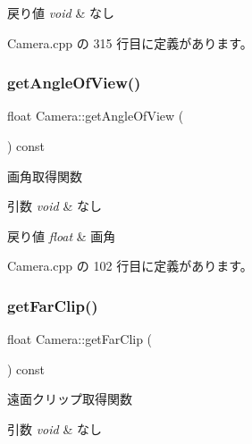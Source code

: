 \begin{DoxyRetVals}{戻り値}
{\em void} & なし \\
\hline
\end{DoxyRetVals}


 Camera.\+cpp の 315 行目に定義があります。

\mbox{\label{class_camera_a19d2d19ddd9307c66075c83e515bda57}} 
\subsubsection{\texorpdfstring{get\+Angle\+Of\+View()}{getAngleOfView()}}
{\footnotesize\ttfamily float Camera\+::get\+Angle\+Of\+View (\begin{DoxyParamCaption}{ }\end{DoxyParamCaption}) const}



画角取得関数 


\begin{DoxyParams}{引数}
{\em void} & なし \\
\hline
\end{DoxyParams}

\begin{DoxyRetVals}{戻り値}
{\em float} & 画角 \\
\hline
\end{DoxyRetVals}


 Camera.\+cpp の 102 行目に定義があります。

\mbox{\label{class_camera_a0c7ba904973245fcd1b7e825eaa8d9ba}} 
\subsubsection{\texorpdfstring{get\+Far\+Clip()}{getFarClip()}}
{\footnotesize\ttfamily float Camera\+::get\+Far\+Clip (\begin{DoxyParamCaption}{ }\end{DoxyParamCaption}) const}



遠面クリップ取得関数 


\begin{DoxyParams}{引数}
{\em void} & なし \\
\hline
\end{DoxyParams}

